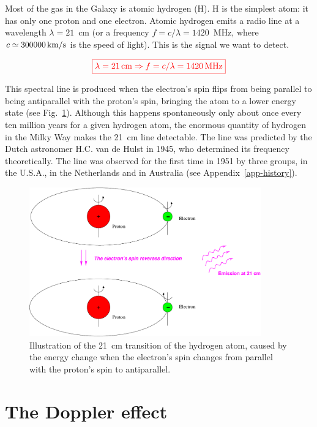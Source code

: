 Most of the gas in the Galaxy is atomic hydrogen (H). 
H is the simplest atom: it has only one proton and one electron. 
Atomic hydrogen emits a radio 
line at a wavelength $\lambda= 21$~cm (or a frequency $f=c/\lambda=1420$~MHz,
where $c\simeq 300 000\, {\rm km/s}$ is the speed of light).  
This is the signal we want to detect. 

\begin{equation}
\color{red}{\boxed{
\lambda = 21 \, {\rm cm}
\Rightarrow f=c/\lambda = 1420 \, {\rm MHz}}}
\end{equation}

This spectral line is produced when the electron's spin flips
from being parallel to being antiparallel with the proton's spin, 
bringing the atom to a lower energy state (see Fig.~\ref{fighyperfin}).  
Although this happens spontaneously only about once every ten million years for a
given hydrogen atom, the enormous quantity of hydrogen in the Milky
Way makes the 21~cm line detectable.  The line was predicted by the Dutch
astronomer H.C. van de Hulst in 1945, who determined its frequency theoretically. 
The line was observed for the first time
in 1951 by three groups, in the U.S.A., in the Netherlands and in
Australia (see Appendix~\ref{app-history}).

\begin{figure}[ht]
\begin{center}
\includegraphics[width=10cm]{../figures/hyperfine.pdf}
\end{center}
\caption{Illustration of the 21~cm transition of the hydrogen atom, 
caused by the energy change when the electron's spin changes from 
parallel with the proton's spin to antiparallel.}
\label{fighyperfin}
\end{figure}  


\section{The Doppler effect}

